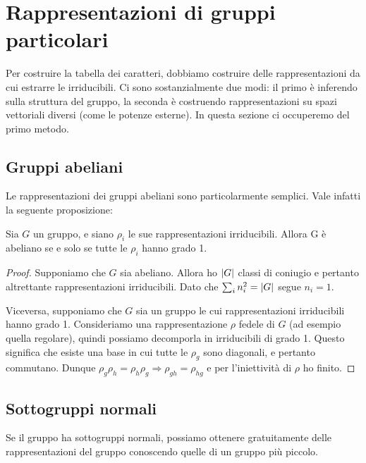 \section{Rappresentazioni di gruppi particolari}
	Per costruire la tabella dei caratteri, dobbiamo costruire delle rappresentazioni da cui estrarre le irriducibili. Ci sono sostanzialmente due modi: il primo è inferendo sulla struttura del gruppo, la seconda è costruendo rappresentazioni su spazi vettoriali diversi (come le potenze esterne). In questa sezione ci occuperemo del primo metodo.
	
	\subsection{Gruppi abeliani}
		Le rappresentazioni dei gruppi abeliani sono particolarmente semplici. Vale infatti la seguente proposizione:
		\begin{myprop}
			Sia $G$ un gruppo, e siano $\rho_i$ le sue rappresentazioni irriducibili. Allora G è abeliano se e solo se tutte le $\rho_i$ hanno grado 1.
		\end{myprop}
		
		\begin{proof}
			Supponiamo che $G$ sia abeliano. Allora ho $\left|G\right|$ classi di coniugio e pertanto altrettante rappresentazioni irriducibili. Dato che $\sum_i n_i^2 = \left|G\right|$ segue $n_i = 1$.
			
			Viceversa, supponiamo che $G$ sia un gruppo le cui rappresentazioni irriducibili hanno grado 1. Consideriamo una rappresentazione $\rho$ fedele di $G$ (ad esempio quella regolare), quindi possiamo decomporla in irriducibili di grado 1. Questo significa che esiste una base in cui tutte le $\rho_g$ sono diagonali, e pertanto commutano. Dunque $\rho_g\rho_h = \rho_h\rho_g \Rightarrow \rho_{gh} = \rho_{hg}$ e per l'iniettività di $\rho$ ho finito.
		\end{proof}

	\subsection{Sottogruppi normali}
		Se il gruppo ha sottogruppi normali, possiamo ottenere gratuitamente delle rappresentazioni del gruppo conoscendo quelle di un gruppo più piccolo.
		
